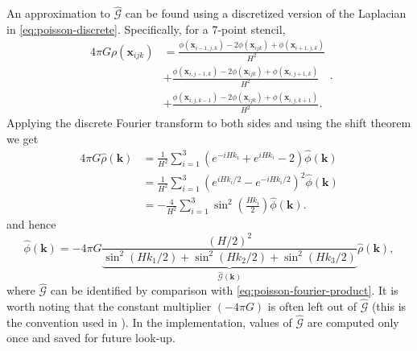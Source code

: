 An approximation to $\hat{\mathcal{G}}$ can be found using a discretized version of the Laplacian in \autoref{eq:poisson-discrete}.
Specifically, for a 7-point stencil,
\begin{equation*}
    \begin{split}
        4\pi G\rho(\mathbf{x}_{ijk})
         & =\frac{\phi(\mathbf{x}_{i-1,j,k}) - 2\phi(\mathbf{x}_{ijk})+\phi(\mathbf{x}_{i+1,j,k})}{H^2}   \\
         & + \frac{\phi(\mathbf{x}_{i,j-1,k}) - 2\phi(\mathbf{x}_{ijk})+\phi(\mathbf{x}_{i,j+1,k})}{H^2}  \\
         & + \frac{\phi(\mathbf{x}_{i,j,k-1}) - 2\phi(\mathbf{x}_{ijk})+\phi(\mathbf{x}_{i,j,k+1})}{H^2}.
    \end{split}.
\end{equation*}
Applying the discrete Fourier transform to both sides and using the shift theorem we get
\begin{align*}
    4\pi G \hat{\rho}(\mathbf{k})
     & = \frac{1}{H^2}\sum_{i=1}^{3}\left( e^{-iHk_i} + e^{iHk_i}-2 \right)\hat{\phi}(\mathbf{k})       \\
     & = \frac{1}{H^2} \sum_{i=1}^{3}\left( e^{iHk_i/2} - e^{-iHk_i/2} \right)^2 \hat{\phi}(\mathbf{k}) \\
     & = -\frac{4}{H^2}\sum_{i=1}^{3}\sin^2\left(\frac{Hk_i}{2}\right)\hat{\phi}(\mathbf{k}).
\end{align*}
and hence
\begin{equation}\label{eq:dft-transformed-phi}
    \hat{\phi}(\mathbf{k}) = -4\pi G\underbrace{\frac{(H/2)^2}{\sin^2(Hk_1/2) + \sin^2(Hk_2/2) + \sin^2 (Hk_3/2)}}_{\hat{\mathcal{G}}(\mathbf{k})} \hat{\rho}(\mathbf{k}),
\end{equation}
where $\hat{\mathcal{G}}$ can be identified by comparison with \autoref{eq:poisson-fourier-product}.
It is worth noting that the constant multiplier $(-4\pi G)$ is often left out of $\hat{\mathcal{G}}$ (this is the convention used in \cite{Hockney1988}).
In the implementation, values of $\hat{\mathcal{G}}$ are computed only once and saved for future look-up.

